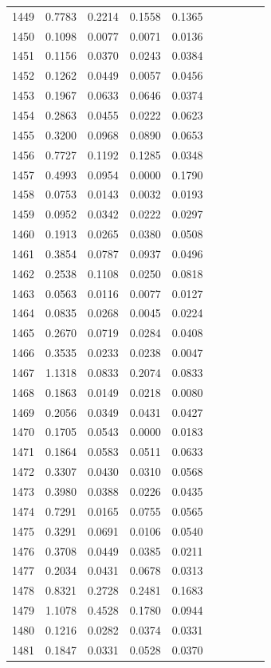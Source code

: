 \begin{table}
\begin{tabular}{cccccccccc}
1449& 0.7783& 0.2214& 0.1558& 0.1365\\ 
1450& 0.1098& 0.0077& 0.0071& 0.0136\\ 
1451& 0.1156& 0.0370& 0.0243& 0.0384\\ 
1452& 0.1262& 0.0449& 0.0057& 0.0456\\ 
1453& 0.1967& 0.0633& 0.0646& 0.0374\\ 
1454& 0.2863& 0.0455& 0.0222& 0.0623\\ 
1455& 0.3200& 0.0968& 0.0890& 0.0653\\ 
1456& 0.7727& 0.1192& 0.1285& 0.0348\\ 
1457& 0.4993& 0.0954& 0.0000& 0.1790\\ 
1458& 0.0753& 0.0143& 0.0032& 0.0193\\ 
1459& 0.0952& 0.0342& 0.0222& 0.0297\\ 
1460& 0.1913& 0.0265& 0.0380& 0.0508\\ 
1461& 0.3854& 0.0787& 0.0937& 0.0496\\ 
1462& 0.2538& 0.1108& 0.0250& 0.0818\\ 
1463& 0.0563& 0.0116& 0.0077& 0.0127\\ 
1464& 0.0835& 0.0268& 0.0045& 0.0224\\ 
1465& 0.2670& 0.0719& 0.0284& 0.0408\\ 
1466& 0.3535& 0.0233& 0.0238& 0.0047\\ 
1467& 1.1318& 0.0833& 0.2074& 0.0833\\ 
1468& 0.1863& 0.0149& 0.0218& 0.0080\\ 
1469& 0.2056& 0.0349& 0.0431& 0.0427\\ 
1470& 0.1705& 0.0543& 0.0000& 0.0183\\ 
1471& 0.1864& 0.0583& 0.0511& 0.0633\\ 
1472& 0.3307& 0.0430& 0.0310& 0.0568\\ 
1473& 0.3980& 0.0388& 0.0226& 0.0435\\ 
1474& 0.7291& 0.0165& 0.0755& 0.0565\\ 
1475& 0.3291& 0.0691& 0.0106& 0.0540\\ 
1476& 0.3708& 0.0449& 0.0385& 0.0211\\ 
1477& 0.2034& 0.0431& 0.0678& 0.0313\\ 
1478& 0.8321& 0.2728& 0.2481& 0.1683\\ 
1479& 1.1078& 0.4528& 0.1780& 0.0944\\ 
1480& 0.1216& 0.0282& 0.0374& 0.0331\\ 
1481& 0.1847& 0.0331& 0.0528& 0.0370\\ 

\end{tabular}
\end{table}
